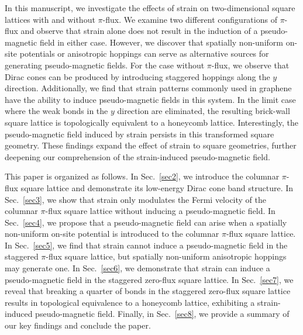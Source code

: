 \documentclass[aps, twocolumn, floatfix, superscriptaddress, prb]{revtex4-1}
\begin{document}
In this manuscript, we investigate the effects of strain on two-dimensional square lattices with and without $\pi$-flux. We examine two different configurations of $\pi$-flux and observe that strain alone does not result in the induction of a pseudo-magnetic field in either case. However, we discover that spatially non-uniform on-site potentials or anisotropic hoppings can serve as alternative sources for generating pseudo-magnetic fields. For the case without $\pi$-flux, we observe that Dirac cones can be produced by introducing staggered hoppings along the $y$ direction. Additionally, we find that strain patterns commonly used in graphene have the ability to induce pseudo-magnetic fields in this system. In the limit case where the weak bonds in the $y$ direction are eliminated, the resulting brick-wall square lattice is topologically equivalent to a honeycomb lattice. Interestingly, the pseudo-magnetic field induced by strain persists in this transformed square geometry. These findings expand the effect of strain to square geometries, further deepening our comprehension of the strain-induced pseudo-magnetic field.

This paper is organized as follows. In Sec.~\ref{sec2}, we introduce the columnar $\pi$-flux square lattice and demonstrate its low-energy Dirac cone band structure. In Sec.~\ref{sec3}, we show that strain only modulates the Fermi velocity of the columnar $\pi$-flux square lattice without inducing a pseudo-magnetic field. In Sec.~\ref{sec4}, we propose that a pseudo-magnetic field can arise when a spatially non-uniform on-site potential is introduced to the columnar $\pi$-flux square lattice. In Sec.~\ref{sec5}, we find that strain cannot induce a pseudo-magnetic field in the staggered $\pi$-flux square lattice, but spatially non-uniform anisotropic hoppings may generate one. In Sec.~\ref{sec6}, we demonstrate that strain can induce a pseudo-magnetic field in the staggered zero-flux square lattice. In Sec.~\ref{sec7}, we reveal that breaking a quarter of bonds in the staggered zero-flux square lattice results in topological equivalence to a honeycomb lattice, exhibiting a strain-induced pseudo-magnetic field. Finally, in Sec.~\ref{sec8}, we provide a summary of our key findings and conclude the paper.
\end{document}
